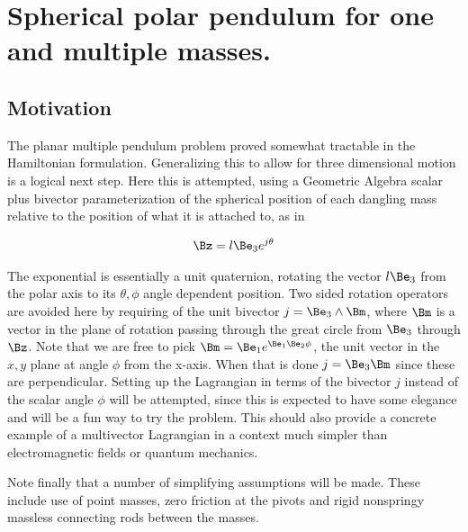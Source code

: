 

\chapter{Spherical polar pendulum for one and multiple masses.}
\label{chap:sPolarMultiPendulum}
{}
\date{Oct 27, 2009}

\beginArtWithToc

\section{Motivation}

The planar multiple pendulum problem proved somewhat tractable in the Hamiltonian formulation.  Generalizing this to allow for three dimensional motion is a logical next step.  Here this is attempted, using a Geometric Algebra scalar plus bivector parameterization of the spherical position of each dangling mass relative to the position of what it is attached to, as in

\begin{align}\label{eqn:sPolarMultiPendulum:zoo1}
\Bz = l \Be_3 e^{j\theta}
\end{align}

The exponential is essentially a unit quaternion, rotating the vector $l \Be_3$ from the polar axis to its $\theta,\phi$ angle dependent position.  Two sided rotation operators are avoided here by requiring of the unit bivector $j = \Be_3 \wedge \Bm$, where $\Bm$ is a vector in the plane of rotation passing through the great circle from $\Be_3$ through $\Bz$.  Note that we are free to pick $\Bm = \Be_1 e^{\Be_1 \Be_2 \phi}$, the unit vector in the $x,y$ plane at angle $\phi$ from the x-axis.  When that is done $j = \Be_3 \Bm$ since these are perpendicular.  Setting up the Lagrangian in terms of the bivector $j$ instead of the scalar angle $\phi$ will be attempted, since this is expected to have some elegance and will be a fun way to try the problem.  This should also provide a concrete example of a multivector Lagrangian in a context much simpler than electromagnetic fields or quantum mechanics.

Note finally that a number of simplifying assumptions will be made.  These include use of point masses, zero friction at the pivots and rigid nonspringy massless connecting rods between the masses.

